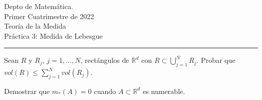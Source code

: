 \documentclass{book}
\newcommand{\rr}{\mathbb{R}}
\begin{document}


\begin{large}
\begin{bfseries} %
        \noindent Depto de Matem\'atica.\\
        Primer Cuatrimestre de 2022\\                                                                                                                                                                                                                                                                                                                                                
        Teoría de la Medida \\
        Práctica 3: Medida de Lebesgue

\end{bfseries}
\end{large}
\par\noindent\rule{\textwidth}{.5pt}









\begin{ejer}{} Sean $R$ y $R_j$, $j=1,\ldots,N$, rectángulos de  $\rr^d$ con $R\subset \bigcup\limits_{j=1}^NR_j$. 
 Probar que $vol(R)\leq \sum\limits_{j=1}^N vol(R_j)$.
\end{ejer}


\begin{ejer}{}  Demostrar que  $m_*(A)=0$  cuando $A\subset\mathbb{R}^d$ es numerable.
\end{ejer}  










 
\end{document}
